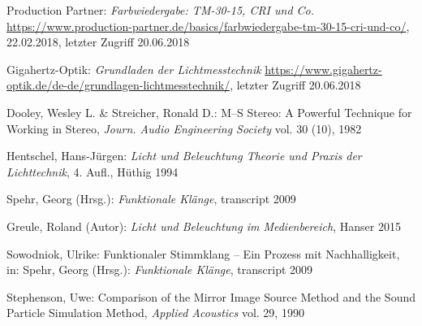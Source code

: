 \begin{thebibliography}{}


Production Partner:
\emph{\glqq Farbwiedergabe: TM-30-15, CRI und Co.\glqq}
\url{https://www.production-partner.de/basics/farbwiedergabe-tm-30-15-cri-und-co/}, 22.02.2018, letzter Zugriff 20.06.2018


Gigahertz-Optik:
\emph{\glqq Grundladen der Lichtmesstechnik\grqq}
\url{https://www.gigahertz-optik.de/de-de/grundlagen-lichtmesstechnik/}, letzter Zugriff 20.06.2018


Dooley, Wesley L.  \& Streicher, Ronald D.:
\glqq M--S Stereo: A Powerful Technique for Working in Stereo\grqq, 
\emph{Journ. Audio Engineering Society} vol. 30 (10), 1982


Hentschel, Hans-Jürgen: 
\emph{Licht und Beleuchtung Theorie und Praxis der Lichttechnik}, 4. Aufl., Hüthig 1994

Spehr, Georg (Hrsg.): 
\emph{Funktionale Klänge}, transcript 2009

Greule, Roland (Autor):
\emph{Licht und Beleuchtung im Medienbereich}, Hanser 2015 


Sowodniok, Ulrike: 
\glqq Funktionaler Stimmklang -- Ein Prozess mit Nachhalligkeit\grqq, 
in: Spehr, Georg (Hrsg.): \emph{Funktionale Klänge}, transcript 2009




Stephenson, Uwe: 
\glqq Comparison of the Mirror Image Source Method and the Sound Particle Simulation Method\grqq, 
\emph{Applied Acoustics} vol. 29, 1990


\end{thebibliography}

\clearpage\thispagestyle{empty}
\eigen  %












